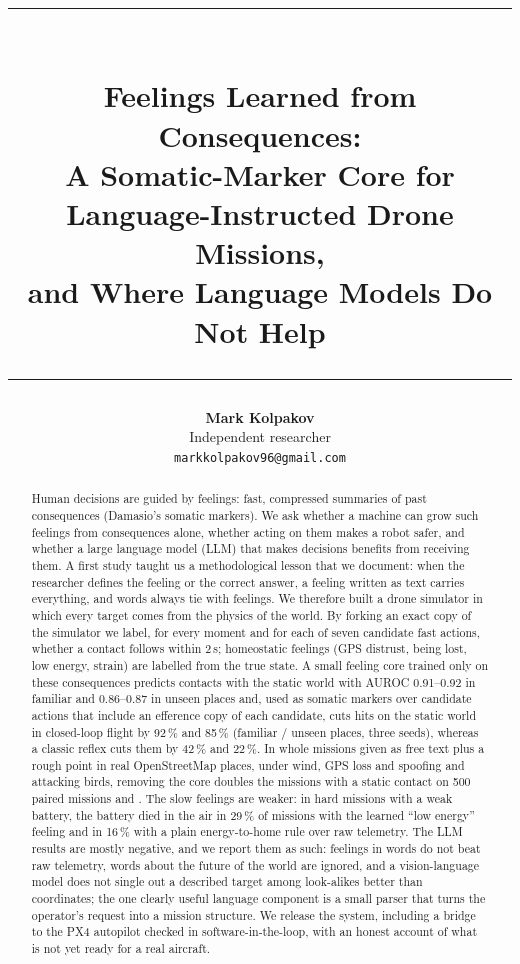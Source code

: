 \documentclass[10pt]{article}
\title{\vspace{-.6em}\rule{\linewidth}{3pt}\\[.55em]\textbf{Feelings Learned from Consequences:\\ A Somatic-Marker Core for Language-Instructed Drone Missions,\\ and Where Language Models Do Not Help}\\[-.15em]\rule{\linewidth}{1pt}}
\author{\textbf{Mark Kolpakov}\\ Independent researcher\\ \texttt{markkolpakov96@gmail.com}}
\date{}
\begin{document}
\maketitle
\thispagestyle{fancy}

\begin{abstract}
Human decisions are guided by feelings: fast, compressed summaries of past consequences (Damasio's somatic markers).
We ask whether a machine can grow such feelings from consequences alone, whether acting on them makes a robot safer, and
whether a large language model (LLM) that makes decisions benefits from receiving them. A first study taught us a
methodological lesson that we document: when the researcher defines the feeling or the correct answer, a feeling written as
text carries everything, and words always tie with feelings. We therefore built a drone simulator in which every target comes
from the physics of the world. By forking an exact copy of the simulator we label, for every moment and for each of seven
candidate fast actions, whether a contact follows within 2\,s; homeostatic feelings (GPS distrust, being lost, low energy,
strain) are labelled from the true state. A small feeling core trained only on these consequences predicts contacts with the
static world with AUROC 0.91--0.92 in familiar and 0.86--0.87 in unseen places and, used as somatic markers over candidate
actions that include an efference copy of each candidate, cuts hits on the static world in closed-loop flight by 92\,\% and
85\,\% (familiar / unseen places, three seeds), whereas a classic reflex cuts them by 42\,\% and 22\,\%. In whole missions given as
free text plus a rough point in real OpenStreetMap places, under wind, GPS loss and spoofing and attacking birds, removing the
core doubles the missions with a static contact on 500 paired missions and \GTWOREPL. The slow feelings are weaker: in hard
missions with a weak battery, the battery died in the air in 29\,\% of missions with the learned ``low energy'' feeling and in
16\,\% with a plain energy-to-home rule over raw telemetry. The LLM results are mostly negative,
and we report them as such: feelings in words do not beat raw telemetry, words about the future of the world are ignored, and a
vision-language model does not single out a described target among look-alikes better than coordinates; the one clearly useful
language component is a small parser that turns the operator's request into a mission structure. We release the system,
including a bridge to the PX4 autopilot checked in software-in-the-loop, with an honest account of what is not yet ready for a
real aircraft.
\end{abstract}
\end{document}
